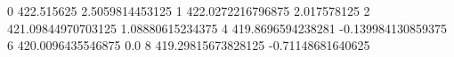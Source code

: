 0 422.515625 2.5059814453125
1 422.0272216796875 2.017578125
2 421.09844970703125 1.08880615234375
4 419.8696594238281 -0.139984130859375
6 420.0096435546875 0.0
8 419.29815673828125 -0.71148681640625
